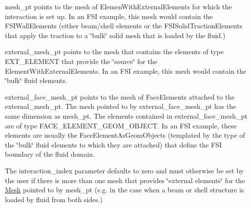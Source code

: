 \begin{DoxyItemize}
\item {\ttfamily mesh\+\_\+pt} points to the mesh of {\ttfamily Elemen\+With\+External\+Elements} for which the interaction is set up. In an F\+SI example, this mesh would contain the {\ttfamily F\+S\+I\+Wall\+Elements} (either beam/shell elements or the {\ttfamily F\+S\+I\+Solid\+Traction\+Elements} that apply the traction to a \char`\"{}bulk\char`\"{} solid mesh that is loaded by the fluid.)
\item {\ttfamily external\+\_\+mesh\+\_\+pt} points to the mesh that contains the elements of type E\+X\+T\+\_\+\+E\+L\+E\+M\+E\+NT that provide the \char`\"{}source\char`\"{} for the {\ttfamily Element\+With\+External\+Elements}. In an F\+SI example, this mesh would contain the \char`\"{}bulk\char`\"{} fluid elements.
\item {\ttfamily external\+\_\+face\+\_\+mesh\+\_\+pt} points to the mesh of {\ttfamily Face\+Elements} attached to the {\ttfamily external\+\_\+mesh\+\_\+pt}. The mesh pointed to by {\ttfamily external\+\_\+face\+\_\+mesh\+\_\+pt} has the same dimension as {\ttfamily mesh\+\_\+pt}. The elements contained in {\ttfamily external\+\_\+face\+\_\+mesh\+\_\+pt} are of type F\+A\+C\+E\+\_\+\+E\+L\+E\+M\+E\+N\+T\+\_\+\+G\+E\+O\+M\+\_\+\+O\+B\+J\+E\+CT. In an F\+SI example, these elements are usually the {\ttfamily Face\+Element\+As\+Geom\+Objects} (templated by the type of the \char`\"{}bulk\char`\"{} fluid elements to which they are attached) that define the F\+SI boundary of the fluid domain.
\item The interaction\+\_\+index parameter defaults to zero and must otherwise be set by the user if there is more than one mesh that provides \char`\"{}external
  elements\char`\"{} for the \hyperlink{classoomph_1_1Mesh}{Mesh} pointed to by mesh\+\_\+pt (e.\+g. in the case when a beam or shell structure is loaded by fluid from both sides.)
\end{DoxyItemize}

